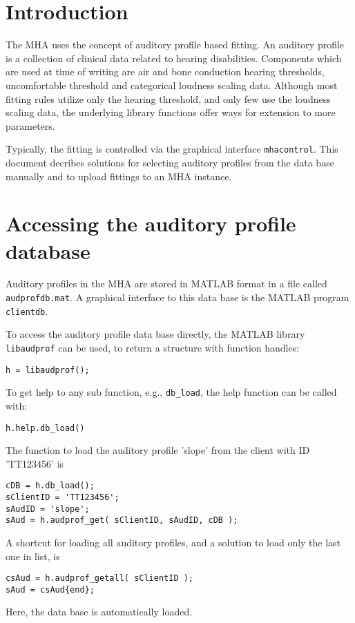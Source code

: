 \documentclass[11pt,a4paper,twoside]{article}
\begin{document}
\newpage
\MHAcopyright{}
\newpage
\tableofcontents
\newpage
\renewcommand{\leftmark}{\rightmark}

\section{Introduction}

The MHA uses the concept of auditory profile based fitting. An
auditory profile is a collection of clinical data related to hearing
disabilities. Components which are used at time of writing are air and
bone conduction hearing thresholds, uncomfortable threshold and
categorical loudness scaling data. Although most fitting rules utilize
only the hearing threshold, and only few use the loudness scaling
data, the underlying library functions offer ways for extension to
more parameters.

Typically, the fitting is controlled via the graphical interface
\verb!mhacontrol!. This document decribes solutions for selecting
auditory profiles from the data base manually and to upload fittings
to an MHA instance.

\section{Accessing the auditory profile database}

Auditory profiles in the MHA are stored in MATLAB format in a file
called \verb!audprofdb.mat!. A graphical interface to this data base
is the MATLAB program \verb!clientdb!.

To access the auditory profile data base directly, the MATLAB library
\verb!libaudprof! can be used, to return a structure with function
handles:
\begin{verbatim}
h = libaudprof();
\end{verbatim}
To get help to any sub function, e.g., \verb!db_load!, the help
function can be called with:
\begin{verbatim}
h.help.db_load()
\end{verbatim}
The function to load the auditory profile 'slope' from the client with
ID 'TT123456' is
\begin{verbatim}
cDB = h.db_load();
sClientID = 'TT123456';
sAudID = 'slope';
sAud = h.audprof_get( sClientID, sAudID, cDB );
\end{verbatim}
A shortcut for loading all auditory profiles, and a solution to load
only the last one in list, is
\begin{verbatim}
csAud = h.audprof_getall( sClientID );
sAud = csAud{end};
\end{verbatim}
Here, the data base is automatically loaded.
\end{document}
